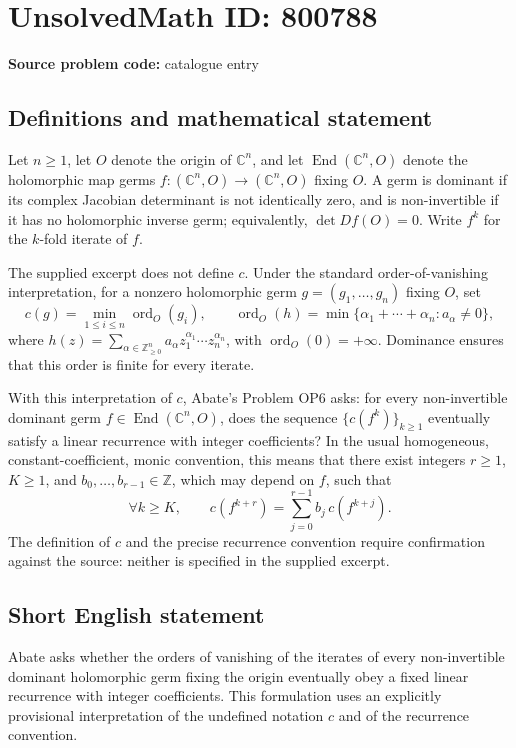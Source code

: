 \documentclass[11pt]{article}
\newcommand{\Z}{\mathbb{Z}}
\newcommand{\C}{\mathbb{C}}
\begin{document}
\section*{UnsolvedMath ID: 800788}
\textbf{Source problem code:} catalogue entry
\subsection{Definitions and mathematical statement}
Let \(n\geq 1\), let \(O\) denote the origin of \(\C^n\), and let \(\operatorname{End}(\C^n,O)\) denote the holomorphic map germs \(f:(\C^n,O)\to(\C^n,O)\) fixing \(O\). A germ is dominant if its complex Jacobian determinant is not identically zero, and is non-invertible if it has no holomorphic inverse germ; equivalently, \(\det Df(O)=0\). Write \(f^k\) for the \(k\)-fold iterate of \(f\).

The supplied excerpt does not define \(c\). Under the standard order-of-vanishing interpretation, for a nonzero holomorphic germ \(g=(g_1,\ldots,g_n)\) fixing \(O\), set
\[
 c(g)=\min_{1\leq i\leq n}\operatorname{ord}_O(g_i),
 \qquad
 \operatorname{ord}_O(h)=\min\{\alpha_1+\cdots+\alpha_n:a_\alpha\neq0\},
\]
where \(h(z)=\sum_{\alpha\in\Z_{\geq0}^n}a_\alpha z_1^{\alpha_1}\cdots z_n^{\alpha_n}\), with \(\operatorname{ord}_O(0)=+\infty\). Dominance ensures that this order is finite for every iterate.

With this interpretation of \(c\), Abate's Problem OP6 asks: for every non-invertible dominant germ \(f\in\operatorname{End}(\C^n,O)\), does the sequence \(\{c(f^k)\}_{k\geq1}\) eventually satisfy a linear recurrence with integer coefficients? In the usual homogeneous, constant-coefficient, monic convention, this means that there exist integers \(r\geq1\), \(K\geq1\), and \(b_0,\ldots,b_{r-1}\in\Z\), which may depend on \(f\), such that
\[
 \forall k\geq K,\qquad
 c(f^{k+r})=\sum_{j=0}^{r-1}b_j\,c(f^{k+j}).
\]
The definition of \(c\) and the precise recurrence convention require confirmation against the source: neither is specified in the supplied excerpt.
\subsection{Short English statement}
Abate asks whether the orders of vanishing of the iterates of every non-invertible dominant holomorphic germ fixing the origin eventually obey a fixed linear recurrence with integer coefficients. This formulation uses an explicitly provisional interpretation of the undefined notation \(c\) and of the recurrence convention.
\end{document}
